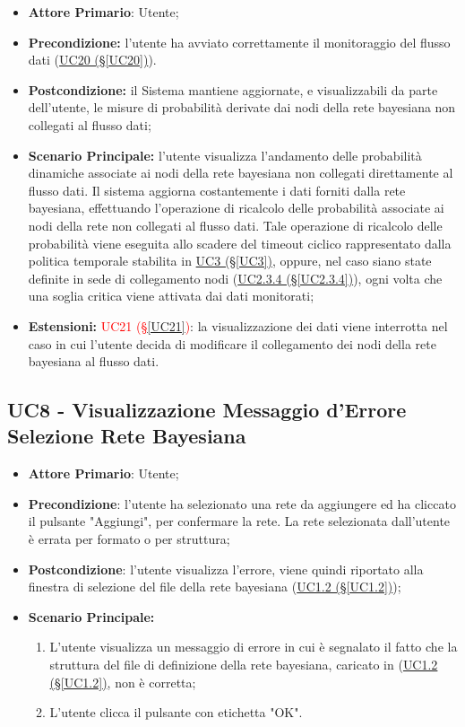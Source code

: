 \begin{itemize}
\item \textbf{Attore Primario}: Utente;
\item \textbf{Precondizione:} l'utente ha avviato correttamente il monitoraggio del flusso dati (\hyperref[UC20]{UC20 (§\ref*{UC20})}).
\item \textbf{Postcondizione:} il Sistema mantiene aggiornate, e visualizzabili da parte dell'utente, le misure di probabilità derivate dai nodi della rete bayesiana non collegati al flusso dati;
\item \textbf{Scenario Principale:} l'utente visualizza l'andamento delle probabilità dinamiche associate ai nodi 			della rete bayesiana non collegati direttamente al flusso dati. Il sistema aggiorna costantemente i dati forniti dalla rete bayesiana, effettuando l'operazione di ricalcolo delle probabilità associate ai nodi della rete non collegati al flusso dati. Tale operazione di ricalcolo delle probabilità viene eseguita allo scadere del timeout ciclico rappresentato dalla politica temporale stabilita in \hyperref[UC3]{UC3 (§\ref*{UC3})}, oppure, nel caso siano state definite in sede di collegamento nodi (\hyperref[UC2.3.4]{UC2.3.4 (§\ref*{UC2.3.4})}), ogni volta che una soglia critica viene attivata dai dati monitorati;
\item \textbf{Estensioni:} \textcolor{red}{UC21 (§\ref*{UC21})}: la visualizzazione dei dati viene interrotta nel 			caso in cui l'utente decida di modificare il collegamento dei nodi della rete bayesiana al flusso dati.
\end{itemize}

\pagebreak

\subsection{UC8 - Visualizzazione Messaggio d'Errore Selezione Rete Bayesiana}\label{UC8}
\begin{itemize}
\item \textbf{Attore Primario}: Utente;
\item \textbf{Precondizione}: l'utente ha selezionato una rete da aggiungere ed ha cliccato il pulsante "Aggiungi", per confermare la rete. La rete selezionata dall'utente è errata per formato o per struttura;
\item \textbf{Postcondizione}: l'utente visualizza l'errore, viene quindi riportato alla finestra di selezione del file della rete bayesiana (\hyperref[UC1.2]{UC1.2 (§\ref*{UC1.2})});
\item \textbf{Scenario Principale:}
	\begin{enumerate}
	\item L'utente visualizza un messaggio di errore in cui è segnalato il fatto che la struttura del file di definizione della rete bayesiana, caricato in (\hyperref[UC1.2]{UC1.2 (§\ref*{UC1.2})}, non è corretta;
	\item L'utente clicca il pulsante con etichetta "OK".
	\end{enumerate}
\end{itemize}

